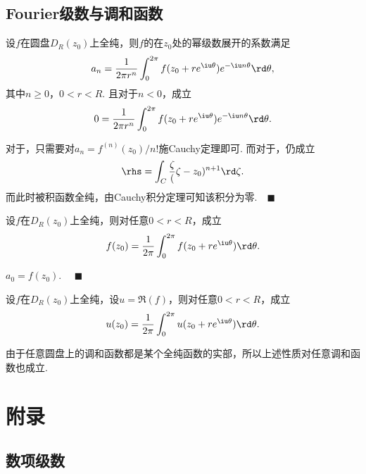
\subsection{Fourier级数与调和函数}

  \begin{thm}
    设$f$在圆盘$D_R(z_0)$上全纯，则$f$的在$z_0$处的幂级数展开的系数满足
    \begin{equation}
      \label{equ: 幂级数系数}
      a_n = \frac{1}{2\pi r^n}\int_0^{2\pi}f(z_0+re^{\iu\theta})e^{-\iu n\theta}\rd\theta,
    \end{equation}
    其中$n\ge 0$，$0<r<R$. 且对于$n<0$，成立
    \begin{equation}
      \label{equ: 幂级数系数2}
      0 = \frac{1}{2\pi r^n}\int_0^{2\pi}f(z_0+re^{\iu\theta})e^{-\iu n\theta}\rd\theta.
    \end{equation}
  \end{thm}
  \proof
    对于，只需要对$a_n = f^{(n)}(z_0)/n!$施Cauchy定理即可.
    而对于，仍成立
    \[
      \rhs = \int_C\frac{\zeta}(\zeta-z_0)^{n+1}\rd\zeta.
    \]
    而此时被积函数全纯，由Cauchy积分定理可知该积分为零.$\quad\blacksquare$

  \begin{cor}[中值]
    设$f$在$D_R(z_0)$上全纯，则对任意$0<r<R$，成立
    \[
      f(z_0) = \frac{1}{2\pi}\int_0^{2\pi}f(z_0+re^{\iu\theta})\rd\theta.
    \]
  \end{cor}
  \proof
    $a_0 = f(z_0)$. $\quad\blacksquare$

  \begin{cor}
    设$f$在$D_R(z_0)$上全纯，设$u=\Re(f)$，则对任意$0<r<R$，成立
    \[
      u(z_0) = \frac{1}{2\pi}\int_0^{2\pi}u(z_0+re^{\iu\theta})\rd\theta.
    \]
  \end{cor}
  \remark
    由于任意圆盘上的调和函数都是某个全纯函数的实部，所以上述性质对任意调和函数也成立.


\newpage
\section{附录}

\subsection{数项级数}

